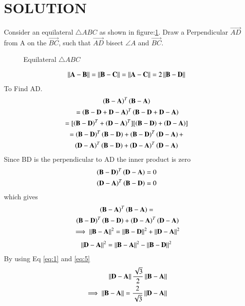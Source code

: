 \documentclass[journal,12pt,twocolumn]{IEEEtran}
\begin{document}
\section{SOLUTION}
Consider an equilateral $\triangle{ABC}$ as shown in figure:\ref{fig:es1}. Draw a Perpendicular $\vec{AD}$ from A on the $\vec{BC}$, such that $\vec{AD}$ bisect $\angle A$ and $\vec{BC}$.
\renewcommand{\thefigure}{1}
\begin{figure}[!ht]
    \centering
    \resizebox{7cm}{!}{}
    \caption{Equilateral $\triangle{ABC}$}
    \label{fig:es1}
\end{figure}
\begin{align}
    \label{eq:1}\left\lVert\mathbf{A-B}\right\rVert=\left\lVert\mathbf{B-C}\right\rVert=\left\lVert\mathbf{A-C}\right\rVert= 2\left\lVert\mathbf{B-D}\right\rVert
\end{align}
To Find AD.
\begin{multline}
 \brak{\vec{B-A}}^{T}\brak{\vec{B-A}}\\\ =\brak{\vec{B-D+D-A}}^{T}\brak{\vec{B-D+D-A}}\\
 = [\brak{\vec{B-D}}^{T}+\brak{\vec{D-A}}^{T}][\brak{\vec{B-D}}+\brak{\vec{D-A}}]\\
 =\brak{\vec{B-D}}^{T}\brak{\vec{B-D}} + \brak{\vec{B-D}}^{T}\brak{\vec{D-A}} +\\ \brak{\vec{D-A}}^{T}\brak{\vec{B-D}} + \brak{\vec{D-A}}^{T}\brak{\vec{D-A}}
\end{multline}
Since BD is the perpendicular to AD the inner product is zero
\begin{align}
   \left(\mathbf{B-D}\right)^{T}\left(\mathbf{D-A}\right)=0\\ \left(\mathbf{D-A}\right)^{T}\left(\mathbf{B-D}\right) =0
\end{align}
which gives
\begin{multline}
    \brak{\vec{B-A}}^{T}\brak{\vec{B-A}} =\\\ \brak{\vec{B-D}}^{T}\brak{\vec{B-D}} + \brak{\vec{D-A}}^{T}\brak{\vec{D-A}}\\
    \implies\norm{\vec{B-A}}^2=\norm{\vec{B-D}}^2 + \norm{\vec{D-A}}^2
\end{multline} 
\begin{align}
  \left\lVert\mathbf{D-A}\right\rVert^2=\left\lVert\mathbf{B-A}\right\rVert^2-\left\lVert\mathbf{B-D}\right\rVert^2\label{eq:5}
\end{align}
By using Eq \eqref{eq:1} and \eqref{eq:5}
\begin{align}
 \left\lVert\mathbf{D-A}\right\rVert\frac{\sqrt{3}}{2}\left\lVert\mathbf{B-A}\right\rVert\\
  \implies\left\lVert\mathbf{B-A}\right\rVert = \frac{2}{\sqrt{3}}\left\lVert\mathbf{D-A}\right\rVert\label{eq:6}
\end{align}
\end{document}
